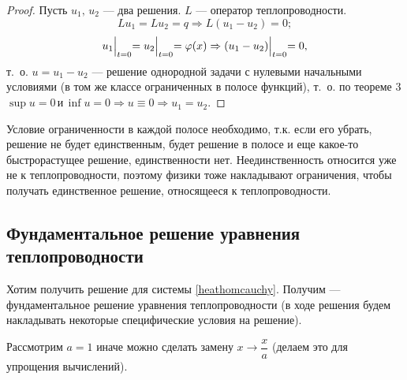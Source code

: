 \begin{proof}
Пусть $u_1, \, u_2 $ --- два решения. $L$ --- оператор теплопроводности.
$$Lu_1=Lu_2=q \Rightarrow L(u_1 - u_2) = 0;$$
$$u_1\Bigl|_{t=0} = u_2\Bigl|_{t=0}=\varphi(x) \Rightarrow (u_1-u_2)\Bigl|_{t=0}=0,$$
т.~о. $u = u_1 - u_2$ --- решение однородной задачи с нулевыми начальными условиями (в том же классе ограниченных в полосе функций), т.~о. по теореме 3 $\sup u = 0 \, \text{и} \, \inf u = 0 \Rightarrow u \equiv 0 \Rightarrow u_1 = u_2.$
\end{proof}

\begin{note}
Условие ограниченности в каждой полосе необходимо, т.к. если его убрать, решение не будет единственным, будет решение в полосе и еще какое-то быстрорастущее решение, единственности нет. Неединственность относится уже не к теплопроводности, поэтому физики тоже накладывают ограничения, чтобы получать единственное решение, относящееся к теплопроводности.
\end{note}

\subsection{Фундаментальное решение уравнения теплопроводности}

Хотим получить решение для системы \eqref{heathomcauchy}. Получим --- фундаментальное решение уравнения теплопроводности (в ходе решения будем накладывать некоторые специфические условия на решение).

Рассмотрим $a = 1$ иначе можно сделать замену $x \rightarrow \dfrac{x}{a}$ (делаем это для упрощения вычислений).

